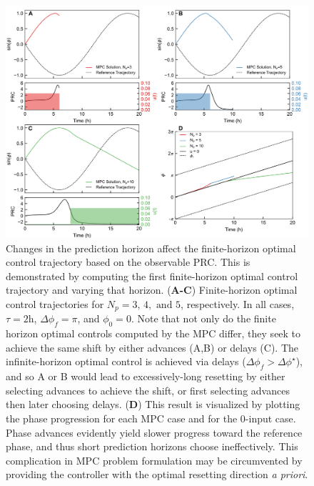 \begin{figure}[p]
    \begin{center}
    \includegraphics[width=\textwidth]{chap6/figures/figure_6.png}
\end{center}
      \caption{\label{fig:horizon}
      Changes in the prediction horizon affect the finite-horizon optimal control trajectory based on the observable PRC. This is demonstrated by computing the first finite-horizon optimal control trajectory and varying that horizon. (\textbf{A-C}) Finite-horizon optimal control trajectories for $N_p=3,\,4,\text{ and } 5$, respectively. In all cases, $\tau=2$h, $\Delta\phi_f=\pi$, and $\phi_0=0$. Note that not only do the finite horizon optimal controls computed by the MPC differ, they seek to achieve the same shift by either advances (A,B) or delays (C). The infinite-horizon optimal control is achieved via delays ($\Delta\phi_f > \Delta\phi^\star$), and so A or B would lead to excessively-long resetting by either selecting advances to achieve the shift, or first selecting advances then later choosing delays.
      (\textbf{D}) This result is visualized by plotting the phase progression for each MPC case and for the 0-input case. Phase advances evidently yield slower progress toward the reference phase, and thus short prediction horizons choose ineffectively. This complication in MPC problem formulation may be circumvented by providing the controller with the optimal resetting direction \textit{a priori}.
  }
\end{figure}



